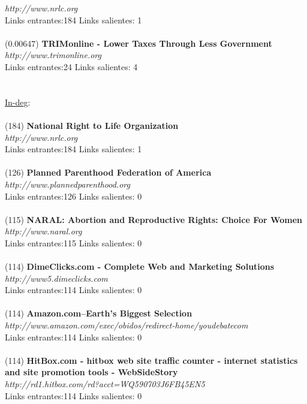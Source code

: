 \documentclass[a4paper]{article}
\begin{document}
\textit{http://www.nrlc.org} \\
Links entrantes:184 \indent Links salientes: 1\\
\\
(0.00647) \textbf{TRIMonline - Lower Taxes Through Less Government} \\
\textit{http://www.trimonline.org} \\
Links entrantes:24 \indent Links salientes: 4\\
\\
\\
\underline{In-deg}:\\
\\
(184) \textbf{National Right to Life Organization} \\
\textit{http://www.nrlc.org} \\
Links entrantes:184 \indent Links salientes: 1\\
\\
(126) \textbf{Planned Parenthood Federation of America} \\
\textit{http://www.plannedparenthood.org} \\
Links entrantes:126 \indent Links salientes: 0\\
\\
(115) \textbf{NARAL: Abortion and Reproductive Rights: Choice For Women} \\
\textit{http://www.naral.org }\\
Links entrantes:115 \indent Links salientes: 0\\
\\
(114) \textbf{DimeClicks.com - Complete Web and Marketing Solutions} \\
\textit{http://www5.dimeclicks.com }\\
Links entrantes:114 \indent Links salientes: 0\\
\\
(114)\textbf{ Amazon.com--Earth's Biggest Selection }\\
\textit{http://www.amazon.com/exec/obidos/redirect-home/youdebatecom} \\
Links entrantes:114 \indent Links salientes: 0\\
\\
(114) \textbf{HitBox.com - hitbox web site traffic counter - internet statistics and site promotion tools - WebSideStory} \\
\textit{http://rd1.hitbox.com/rd?acct=WQ590703J6FB45EN5} \\
Links entrantes:114 \indent Links salientes: 0\\
\end{document}

